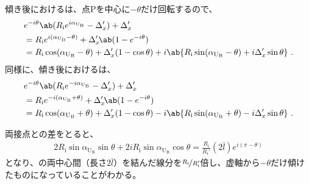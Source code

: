 \subsubsection{\AfterRotatePlateContactPoint}
傾き後における\TopSideReceiverPlateContactPoint は、点Pを中心に$-\theta$だけ回転するので、
\begin{align*}
  &  e^{-i\theta}\ab(R_\mathrm ie^{i\alpha_{\mathrm U_\mathrm B}}-\Delta_x')+\Delta_x'\\
  &= R_\mathrm ie^{i(\alpha_{\mathrm U_\mathrm B}-\theta)}+\Delta_x'\!\ab(1-e^{-i\theta})\\
  &= R_\mathrm i\cos(\alpha_{\mathrm U_\mathrm B}-\theta)+\Delta_x'(1-\cos\theta)
     +i\ab\{R_\mathrm i\sin(\alpha_{\mathrm U_\mathrm B}-\theta)+i\Delta_x'\sin\theta\}\ .
\end{align*}
同様に、傾き後における\BottomSideReceiverPlateContactPoint は、
\begin{align*}
  &  e^{-i\theta}\ab(R_\mathrm ie^{-i\alpha_{\mathrm U_\mathrm B}}-\Delta_x')+\Delta_x'\\
  &= R_\mathrm ie^{-i(\alpha_{\mathrm U_\mathrm B}+\theta)}+\Delta_x'\!\ab(1-e^{-i\theta})\\
  &= R_\mathrm i\cos(\alpha_{\mathrm U_\mathrm B}+\theta)+\Delta_x'(1-\cos\theta)
     -i\ab\{R_\mathrm i\sin(\alpha_{\mathrm U_\mathrm B}+\theta)-i\Delta_x'\sin\theta\}\ .
\end{align*}
\begin{hosoku}
両接点との差をとると、
\begin{align*}
  2R_\mathrm i\sin\alpha_{\mathrm U_\mathrm B}\sin\theta+2iR_\mathrm i\sin\alpha_{\mathrm U_\mathrm B}\cos\theta
  = \frac{R_\mathrm i}{R_\mathrm i'}(2\bar l)e^{i(\pi-\theta)}
\end{align*}
となり、\ReceiverPlate の両中心間（長さ$2\bar l$）を結んだ線分を$\nicefrac{R_\mathrm i}{R_\mathrm i'}$倍し、虚軸から$-\theta$だけ傾けたものになっていることがわかる。
\end{hosoku}


